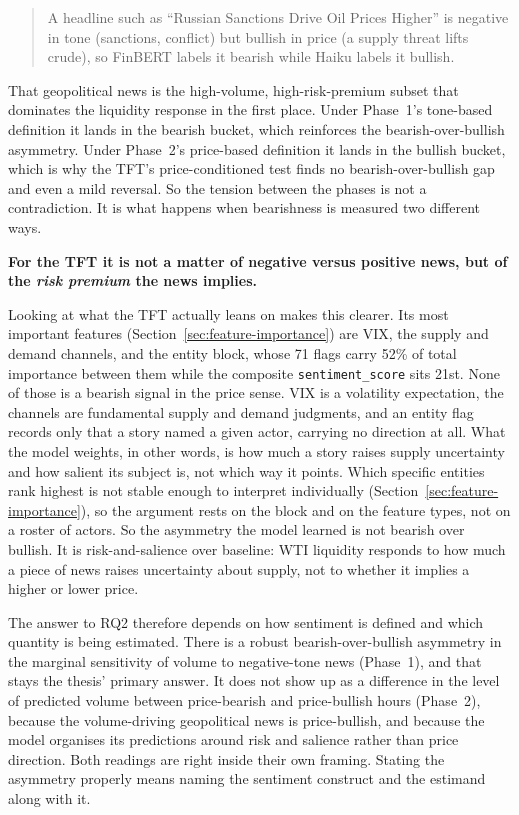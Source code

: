 \begin{quote}
A headline such as ``Russian Sanctions Drive Oil Prices Higher'' is negative in tone (sanctions, conflict) but bullish in price (a supply threat lifts crude), so FinBERT labels it bearish while Haiku labels it bullish.
\end{quote}

That geopolitical news is the high-volume, high-risk-premium subset that dominates the liquidity response in the first place. Under Phase~1's tone-based definition it lands in the bearish bucket, which reinforces the bearish-over-bullish asymmetry. Under Phase~2's price-based definition it lands in the bullish bucket, which is why the TFT's price-conditioned test finds no bearish-over-bullish gap and even a mild reversal. So the tension between the phases is not a contradiction. It is what happens when bearishness is measured two different ways.

\textbf{For the TFT it is not a matter of negative versus positive news, but of the \emph{risk premium} the news implies.}

Looking at what the TFT actually leans on makes this clearer. Its most important features (Section~\ref{sec:feature-importance}) are VIX, the supply and demand channels, and the entity block, whose 71 flags carry 52\% of total importance between them while the composite \texttt{sentiment\_score} sits 21st. None of those is a bearish signal in the price sense. VIX is a volatility expectation, the channels are fundamental supply and demand judgments, and an entity flag records only that a story named a given actor, carrying no direction at all. What the model weights, in other words, is how much a story raises supply uncertainty and how salient its subject is, not which way it points. Which specific entities rank highest is not stable enough to interpret individually (Section~\ref{sec:feature-importance}), so the argument rests on the block and on the feature types, not on a roster of actors. So the asymmetry the model learned is not bearish over bullish. It is risk-and-salience over baseline: WTI liquidity responds to how much a piece of news raises uncertainty about supply, not to whether it implies a higher or lower price.

The answer to RQ2 therefore depends on how sentiment is defined and which quantity is being estimated. There is a robust bearish-over-bullish asymmetry in the marginal sensitivity of volume to negative-tone news (Phase~1), and that stays the thesis' primary answer. It does not show up as a difference in the level of predicted volume between price-bearish and price-bullish hours (Phase~2), because the volume-driving geopolitical news is price-bullish, and because the model organises its predictions around risk and salience rather than price direction. Both readings are right inside their own framing. Stating the asymmetry properly means naming the sentiment construct and the estimand along with it.

